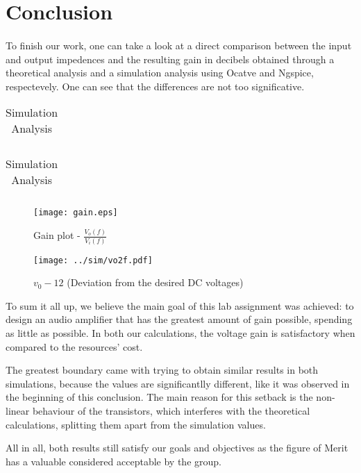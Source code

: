 \newpage{}

\section{Conclusion}
\label{sec:conclusion}
\paragraph{}
\par To finish our work, one can take a look at a direct comparison between the input and output impedences and the resulting gain in decibels obtained through a theoretical analysis and a simulation analysis using Ocatve and Ngspice, respectevely. One can see that the differences are not too significative.

\begin{table}[H]
	\begin{minipage}{.5\linewidth}
		\centering
		\begin{tabular}{|c|c|}
		\hline
		
		\end{tabular}
		\caption{Theoretical Analysis}
		\label{table1a}
	\end{minipage}
	\begin{minipage}{.5\linewidth}
		\centering
		\begin{tabular}{|c|c|}
		\hline
		
		
		
	\end{tabular}
		\caption{Simulation Analysis}
		\label{table1b}
	\end{minipage} 
\end{table}


\begin{figure}[H]
	\texttt{[image: gain.eps]}
	\centering
	\caption{Gain plot - $\frac{V_o(f)}{V_i(f)}$}
	\label{pha}
\end{figure}

\begin{figure}[H]
    \texttt{[image: ../sim/vo2f.pdf]}
    \centering
    \caption{$v_0-12$ (Deviation from the desired DC voltages)}
    \label{mag}
\end{figure}

\par To sum it all up, we believe the main goal of this lab assignment was achieved: to design an audio amplifier that has the greatest amount of gain possible, spending as little as possible. In both our calculations, the voltage gain is satisfactory when compared to the resources' cost.
\par The greatest boundary came with trying to obtain similar results in both simulations, because the values are significantlly different, like it was observed in the beginning of this conclusion. The main reason for this setback is the non-linear behaviour of the transistors, which interferes with the theoretical calculations, splitting them apart from the simulation values.
\par All in all, both results still satisfy our goals and objectives as the figure of Merit has a valuable considered acceptable by the group.




